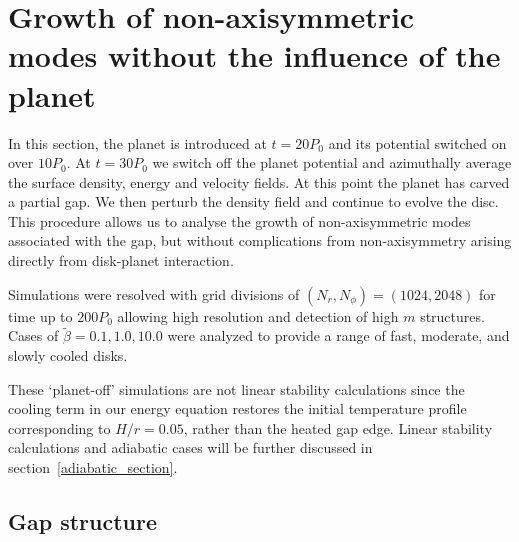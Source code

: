 \section{Growth of non-axisymmetric modes without the influence of the
  planet}
In this section, the planet is introduced at $t=20P_0$ and 
its potential switched on over $10P_0$. At $t=30P_0$ we switch off the
planet potential and azimuthally average the surface density, energy
and velocity fields. At this point the planet has carved a partial
gap. We then perturb the density field and continue to 
evolve the disc. This procedure allows us to analyse the growth of
non-axisymmetric modes associated with the gap, but without
complications from non-axisymmetry arising directly from disk-planet
interaction.

Simulations were resolved with grid divisions of $(N_r,N_{\phi})=(1024,2048)$ for time up to $200P_0$ allowing high resolution and detection of high $m$ structures. Cases of $\tilde{\beta}=0.1,1.0,10.0$ were analyzed to provide a range of fast, moderate, and slowly cooled disks.

These `planet-off' simulations are not linear stability calculations
since the cooling term in our energy equation restores the initial temperature profile corresponding to $H/r=0.05$, rather than the heated gap edge. Linear stability calculations and adiabatic cases will be further discussed in section~\ref{adiabatic_section}.





\subsection{Gap structure}

